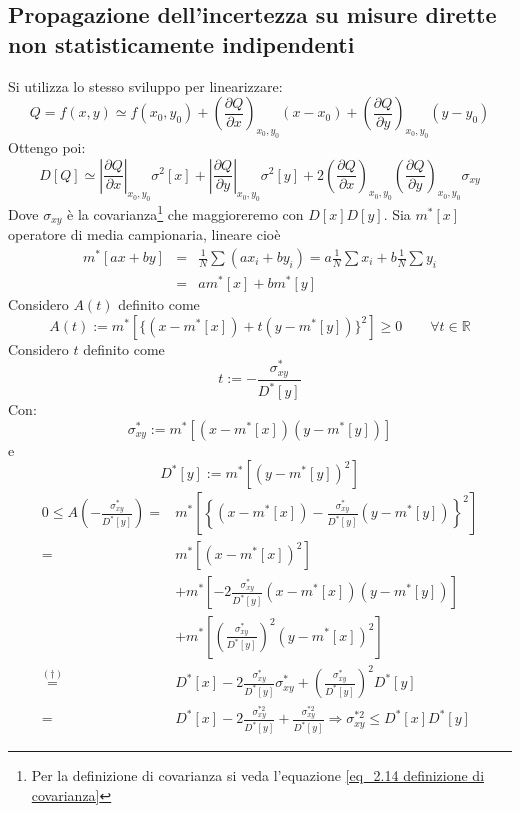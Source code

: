 \documentclass[11pt,a4paper]{book}
\begin{document}
\subsection{Propagazione dell'incertezza su misure dirette non statisticamente indipendenti} 
Si utilizza lo stesso sviluppo per linearizzare:
\begin{equation}
Q = f(x,y) \simeq f(x_0,y_0) + \left( \frac{\partial Q}{\partial x}\right)_{x_0,y_0}  (x-x_0)+\left( \frac{\partial Q}{\partial y}\right)_{x_0,y_0}  (y-y_0)
\end{equation}
Ottengo poi:
\begin{equation}
D[Q] \simeq \left|\frac{\partial Q}{\partial x} \right|_{x_0,y_0} \sigma^2[x]+\left|\frac{\partial Q}{\partial y} \right|_{x_0,y_0} \sigma^2[y]+2\left( \frac{\partial Q}{\partial x} \right)_{x_0,y_0} \left( \frac{\partial Q}{\partial y} \right)_{x_0,y_0} \sigma_{xy}
\end{equation}
Dove  $ \sigma_{xy} $ è la covarianza\footnote{Per la definizione di covarianza si veda l'equazione \eqref{eq_2.14 definizione di covarianza}} che maggioreremo con $ D[x]D[y] $. Sia $ m^* [x]$ operatore di media campionaria, lineare cioè 
\begin{eqnarray}
m^*[ax+by] &=& \frac{1}{N}\sum (ax_i+by_i) = a \frac{1}{N}\sum x_i+ b \frac{1}{N}\sum y_i\\
&=& am^*[x]+bm^*[y]
\end{eqnarray}
Considero $ A(t) $ definito come
\begin{equation}
A(t):=m^*[\{(x-m^*[x])+t(y-m^*[y])\}^2]\geq0 \qquad \forall t \in \mathbb{R}
\end{equation}
Considero $ t $ definito come
\begin{equation}
t:= -\frac{\sigma_{xy}^*}{D^*[y]}
\end{equation}
Con:
\begin{equation}
\sigma_{xy}^*:=m^*[(x-m^*[x])(y-m^*[y])]
\end{equation}
e
\begin{equation}
D^*[y]:= m^*\left[ (y-m^*[y])^2\right] 
\end{equation}
\begin{align}
0\leq A(-\frac{\sigma_{xy}^*}{D^*[y]})  = & m^*\left[ \left\lbrace \left( x-m^*[x]\right) -\frac{\sigma_{xy}^*}{D^*[y]}\left( y-m^*[y]\right) \right\rbrace ^2\right]  \\
= & m^*\left[ (x-m^*[x])^2\right]  \label{eq_2.90_dimostrazione covarianza} \\ 
&+ m^*\left[ -2\frac{\sigma_{xy}^*}{D^*[y]}(x-m^*[x])(y-m^*[y])\right] \label{eq_2.91_dimostrazione covarianza} \\
&+ m^*\left[ \left( \frac{\sigma^*_{xy}}{D^*[y]} \right)^2 (y-m^*[x])^2 \right]  \label{eq_2.93_dimostrazione covarizana}\\
\stackrel{(\dag)}{=} & D^*[x] -2\frac{\sigma_{xy}^*}{D^*[y]} \sigma_{xy}^*+\left( \frac{\sigma^*_{xy}}{D^*[y]} \right)^2  D^*[y] \\
= & D^*[x]-2\frac{\sigma_{xy}^{*2}}{D^*[y]}+\frac{\sigma_{xy}^{*2}}{D^*[y]} \Rightarrow \sigma_{xy}^{*2} \leq D^*[x]D^*[y]
\end{align} 
\end{document}
